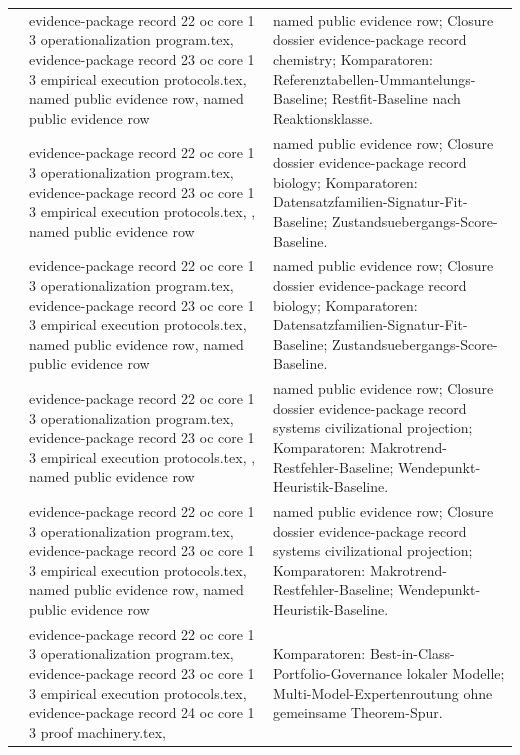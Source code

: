 \begin{longtable}{@{}L{0.16\textwidth}L{0.38\textwidth}L{0.34\textwidth}@{}}
 & evidence-package record 22 oc core 1 3 operationalization program.tex, \allowbreak evidence-package record 23 oc core 1 3 empirical execution protocols.tex, named public evidence row, named public evidence row & named public evidence row; Closure dossier evidence-package record chemistry; Komparatoren: Referenztabellen-Ummantelungs-Baseline; Restfit-Baseline nach Reaktionsklasse. \\
 & evidence-package record 22 oc core 1 3 operationalization program.tex, \allowbreak evidence-package record 23 oc core 1 3 empirical execution protocols.tex, \allowbreak {}, named public evidence row & named public evidence row; Closure dossier evidence-package record biology; Komparatoren: Datensatzfamilien-Signatur-Fit-Baseline; Zustandsuebergangs-Score-Baseline. \\
 & evidence-package record 22 oc core 1 3 operationalization program.tex, \allowbreak evidence-package record 23 oc core 1 3 empirical execution protocols.tex, named public evidence row, named public evidence row & named public evidence row; Closure dossier evidence-package record biology; Komparatoren: Datensatzfamilien-Signatur-Fit-Baseline; Zustandsuebergangs-Score-Baseline. \\
 & evidence-package record 22 oc core 1 3 operationalization program.tex, \allowbreak evidence-package record 23 oc core 1 3 empirical execution protocols.tex, \allowbreak {}, named public evidence row & named public evidence row; Closure dossier evidence-package record systems civilizational projection; Komparatoren: Makrotrend-Restfehler-Baseline; Wendepunkt-Heuristik-Baseline. \\
 & evidence-package record 22 oc core 1 3 operationalization program.tex, \allowbreak evidence-package record 23 oc core 1 3 empirical execution protocols.tex, named public evidence row, named public evidence row & named public evidence row; Closure dossier evidence-package record systems civilizational projection; Komparatoren: Makrotrend-Restfehler-Baseline; Wendepunkt-Heuristik-Baseline. \\
 & evidence-package record 22 oc core 1 3 operationalization program.tex, \allowbreak evidence-package record 23 oc core 1 3 empirical execution protocols.tex, \allowbreak evidence-package record 24 oc core 1 3 proof machinery.tex, \allowbreak {} & Komparatoren: Best-in-Class-Portfolio-Governance lokaler Modelle; Multi-Model-Expertenroutung ohne gemeinsame Theorem-Spur. \\
\bottomrule
\end{longtable}

